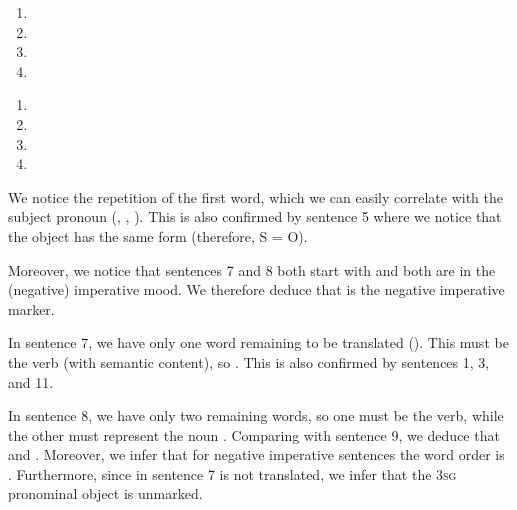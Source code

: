 \begin{refsection}
\begin{problem}{\langnameNung}{\nameAWade}{}
\begin{assgts}
\item \transinen
\begin{enumerate}[start = 13]
    \item {}
    \item {}
    \item {}
    \item {}
\end{enumerate}
\item \transinen[\langnameNung]
\begin{enumerate}[start = 17]
    \item {}
    \item {}
    \item {}
    \item {}
\end{enumerate}
\end{assgts}
\end{problem}

\begin{mysolution}

\begin{description}[labelwidth=\widthof{\bfseries Step 3.},leftmargin=!]\sloppy
\item[Step 1.] We notice the repetition of the first word, which we can easily correlate with the subject pronoun (, , ). This is also confirmed by sentence 5 where we notice that the object has the same form (therefore, S = O).

Moreover, we notice that sentences 7 and 8 both start with  and both are in the (negative) imperative mood. We therefore deduce that  is the negative imperative marker.

\item[Step 2.] In sentence 7, we have only one word remaining to be translated (). This must be the verb (with semantic content), so . This is also confirmed by sentences 1, 3, and 11.

In sentence 8, we have only two remaining words, so one must be the verb, while the other must represent the noun . Comparing with sentence 9, we deduce that  and . Moreover, we infer that for negative imperative sentences the word order is . Furthermore, since in sentence 7  is not translated, we infer that the 3\textsc{sg} pronominal object is unmarked.


\end{description}
\end{mysolution}
\end{refsection}
